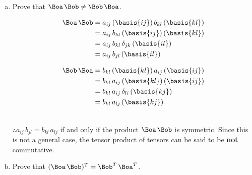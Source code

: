 \documentclass[a4paper,twosided,11pt,DIV15]{scrartcl}
\begin{document}
\begin{enumerate}[(a)]
\item Prove that $\Boa\,\Bob\neq\Bob\,\Boa$.\\
\begin{minipage}{0.5\textwidth}
\begin{align*}
    \Boa\,\Bob &= a_{ij}\,(\basis{ij})\,b_{kl}\,(\basis{kl})\\
    &= a_{ij}\,b_{kl}\,(\basis{ij})\,(\basis{kl}) \\
    &= a_{ij}\,b_{kl}\,\delta_{jk}\,(\basis{il})\\
    &= a_{ij}\,b_{jl}\,(\basis{il})
  \end{align*}
\end{minipage}
\begin{minipage}{0.5\textwidth}
\begin{align*}
    \Bob\,\Boa &= b_{kl}\,(\basis{kl})\,a_{ij}\,(\basis{ij})\\
    &= b_{kl}\,a_{ij}\,(\basis{kl})\,(\basis{ij}) \\
    &= b_{kl}\,a_{ij}\,\delta_{li}\,(\basis{kj})\\
    &= b_{kl}\,a_{lj}\,(\basis{kj})
  \end{align*}
\end{minipage}
\\[1em]
$\therefore a_{ij}\,b_{jl} = b_{kl}\,a_{lj}$ if and only if the
product $\Boa\,\Bob$ is symmetric. Since this is not a general case,
the tensor product of tensors can be said to be \textbf{not} commutative.
\item Prove that $(\Boa\,\Bob)^T=\Bob^T\,\Boa^T$.


\end{enumerate}
\end{document}
